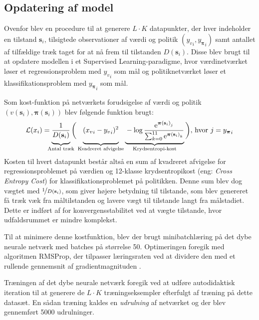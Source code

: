 \documentclass[../main.tex]{subfiles}
\begin{document}
\subsection*{Opdatering af model}

Ovenfor blev en procedure til at generere \(L\cdot K\) datapunkter, der hver indeholder en tilstand \(\mathbf s_i\), tilsigtede observationer af værdi og politik \(\left({y_{v}}_i, {y_{\bm \pi }}_i \right)\) samt antallet af tilfældige træk taget for at nå frem til tilstanden \(D(\mathbf s_i)\). Disse blev  brugt til at opdatere modellen i et Supervised Learning-paradigme, hvor værdinetværket løser et regressionsproblem med \({y_{v}}_i\) som mål og politiknetværket løser et klassifikationsproblem med \({y_{\bm \pi }}_i\) som mål. 

Som kost-funktion på netværkets forudsigelse af værdi og politik
\(\left(v(\mathbf s_i), \bm \pi (\mathbf s_i)\right)\)
blev følgende funktion brugt:
\begin{equation}\label{eq:loss}
	\mathcal L(x_i) =
	\underbrace{\vphantom{\sum_{i}}
		\frac {1} {D(\mathbf s _i)}
	}
	_{\mathclap{
		\text{Antal træk}
		}	
 }
	 \bigg(
		\underbrace{\vphantom{\sum_{i}}
		({x_{v}}_i-{y_{v}}_i )^2
		}
		_{\text{Kvadreret afvigelse}}	
			\underbrace{\vphantom{\sum_{i}}
		- 
		\log 
			\frac{
					\eul{{\bm \pi(\mathbf s_i)}_j
				}
				}
				{
					\sum_{k=0}^{11}
					\eul{{\bm \pi(\mathbf s_i)}_k}
				}
			}
			_\text{Krydsentropi-kost}
	\bigg)
	\text{, hvor } j = {y_{\bm \pi }}_i
\end{equation}
Kosten til hvert datapunkt består altså en sum af kvadreret afvigelse for regressionsproblemet på værdien og 12-klasse krydsentropikost (eng: \textit{Cross Entropy Cost}) for klassifikationsproblemet på politikken.
Denne sum blev dog vægtet med \(\nicefrac 1 {D(\mathbf s _i)}\), som giver højere betydning til tilstande, som blev genereret få træk væk fra måltilstanden og lavere vægt til tilstande langt fra målstadiet.
Dette er indført af \cite{HumansBeGone} for konvergensstabilitet ved at vægte tilstande, hvor udfaldsrummet er mindre komplekst.

Til at minimere denne kostfunktion, blev der brugt minibatchlæring på det dybe neurale netværk med batches på størrelse 50. Optimeringen foregik med algoritmen RMSProp, der tilpasser læringsraten ved at dividere den med et rullende gennemsnit af gradientmagnituden \cite{RMSProp}.

Træningen af det dybe neurale netværk foregik ved at udføre autodidaktisk iteration til at generere de \(L\cdot K\) træningseksempler efterfulgt af træning på dette datasæt. 
En sådan træning kaldes en \textit{udrulning} af netværket og der blev gennemført 5000 udrulninger.
\end{document}
